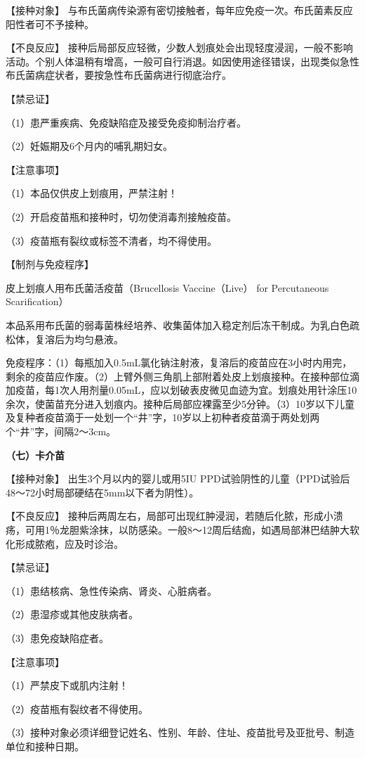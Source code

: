 【接种对象】
与布氏菌病传染源有密切接触者，每年应免疫一次。布氏菌素反应阳性者可不予接种。

【不良反应】
接种后局部反应轻微，少数人划痕处会出现轻度浸润，一般不影响活动。个别人体温稍有增高，一般可自行消退。如因使用途径错误，出现类似急性布氏菌病症状者，要按急性布氏菌病进行彻底治疗。

【禁忌证】

（1）患严重疾病、免疫缺陷症及接受免疫抑制治疗者。

（2）妊娠期及6个月内的哺乳期妇女。

【注意事项】

（1）本品仅供皮上划痕用，严禁注射！

（2）开启疫苗瓶和接种时，切勿使消毒剂接触疫苗。

（3）疫苗瓶有裂纹或标签不清者，均不得使用。

【制剂与免疫程序】

皮上划痕人用布氏菌活疫苗（Brucellosis Vaccine（Live） for Percutaneous
Scarification）

本品系用布氏菌的弱毒菌株经培养、收集菌体加入稳定剂后冻干制成。为乳白色疏松体，复溶后为均匀悬液。

免疫程序：（1）每瓶加入0.5mL氯化钠注射液，复溶后的疫苗应在3小时内用完，剩余的疫苗应作废。（2）上臂外侧三角肌上部附着处皮上划痕接种。在接种部位滴加疫苗，每1次人用剂量0.05mL，应以划破表皮微见血迹为宜。划痕处用针涂压10余次，使菌苗充分进入划痕内。接种后局部应裸露至少5分钟。（3）10岁以下儿童及复种者疫苗滴于一处划一个“井”字，10岁以上初种者疫苗滴于两处划两个“井”字，间隔2～3cm。

\textbf{（七）卡介苗}

【接种对象】 出生3个月以内的婴儿或用5IU
PPD试验阴性的儿童（PPD试验后48～72小时局部硬结在5mm以下者为阴性）。

【不良反应】
接种后两周左右，局部可出现红肿浸润，若随后化脓，形成小溃疡，可用1％龙胆紫涂抹，以防感染。一般8～12周后结痂，如遇局部淋巴结肿大软化形成脓疱，应及时诊治。

【禁忌证】

（1）患结核病、急性传染病、肾炎、心脏病者。

（2）患湿疹或其他皮肤病者。

（3）患免疫缺陷症者。

【注意事项】

（1）严禁皮下或肌内注射！

（2）疫苗瓶有裂纹者不得使用。

（3）接种对象必须详细登记姓名、性别、年龄、住址、疫苗批号及亚批号、制造单位和接种日期。

